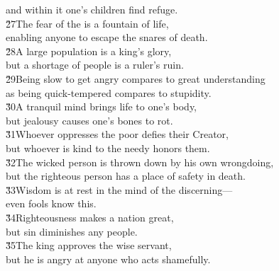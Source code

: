 \begin{poetry}
\poemll    and within it one's children find refuge. \\
\poeml \v{27}The fear of the  is a fountain of life, \\
\poemll    enabling anyone to escape the snares of death. \\
\poeml \v{28}A large population is a king's glory, \\
\poemll    but a shortage of people is a ruler's ruin. \\
\poeml \v{29}Being slow to get angry compares to great understanding \\
\poemll    as being quick-tempered compares to stupidity. \\
\poeml \v{30}A tranquil mind brings life to one's body, \\
\poemll    but jealousy causes one's bones to rot. \\
\poeml \v{31}Whoever oppresses the poor defies their Creator, \\
\poemll    but whoever is kind to the needy honors them. \\
\poeml \v{32}The wicked person is thrown down by his own wrongdoing, \\
\poemll    but the righteous person has a place of safety in death. \\
\poeml \v{33}Wisdom is at rest in the mind of the discerning--- \\
\poemll    even fools know this. \\
\poeml \v{34}Righteousness makes a nation great, \\
\poemll    but sin diminishes any people. \\
\poeml \v{35}The king approves the wise servant, \\
\poemll    but he is angry at anyone who acts shamefully.
\end{poetry}

